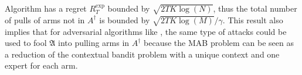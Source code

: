 Algorithm \expfour has a regret $R_{T}^{\text{exp}}$ bounded by $\sqrt{2TK\log(N)}$, thus the total number of pulls of arms not in $A^{\dagger}$ %
is bounded by $\sqrt{2TK\log(M)}/\gamma$. This result also implies that for adversarial algorithms like \expthree \cite{auer2002finite}, the same type of attacks could be used to fool $\mathfrak{A}$ into pulling arms in $A^{\dagger}$ because the MAB problem can be seen as a reduction of the contextual bandit problem with a unique context and one expert for each arm.

